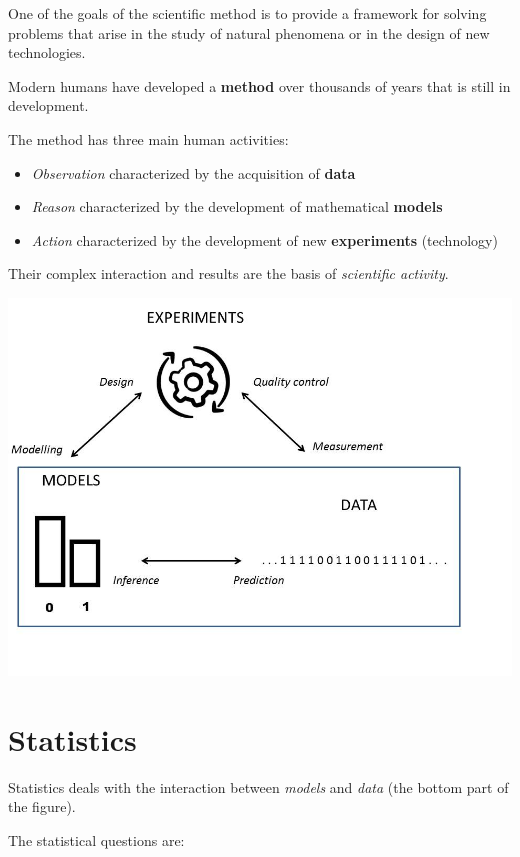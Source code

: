 \documentclass[
]{book}
\providecommand{\tightlist}{%
  \setlength{\itemsep}{0pt}\setlength{\parskip}{0pt}}
\begin{document}
One of the goals of the scientific method is to provide a framework for solving problems that arise in the study of natural phenomena or in the design of new technologies.

Modern humans have developed a \textbf{method} over thousands of years that is still in development.

The method has three main human activities:

\begin{itemize}
\tightlist
\item
  \emph{Observation} characterized by the acquisition of \textbf{data}
\item
  \emph{Reason} characterized by the development of mathematical \textbf{models}
\item
  \emph{Action} characterized by the development of new \textbf{experiments} (technology)
\end{itemize}

Their complex interaction and results are the basis of \emph{scientific activity}.

\includegraphics{./figures/stats.JPG}

\hypertarget{statistics}{%
\section{Statistics}\label{statistics}}

Statistics deals with the interaction between \emph{models} and \emph{data} (the bottom part of the figure).

The statistical questions are:
\end{document}
